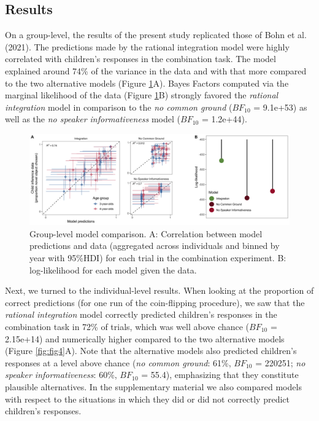 \documentclass[
  man,mask,floatsintext]{apa6}
\begin{document}
\hypertarget{results-1}{%
\subsection{Results}\label{results-1}}

On a group-level, the results of the present study replicated those of Bohn et al. (2021). The predictions made by the rational integration model were highly correlated with children's responses in the combination task. The model explained around 74\% of the variance in the data and with that more compared to the two alternative models (Figure \ref{fig:fig3}A). Bayes Factors computed via the marginal likelihood of the data (Figure \ref{fig:fig3}B) strongly favored the \emph{rational integration} model in comparison to the \emph{no common ground} (\(BF_{10}\) = 9.1e+53) as well as the \emph{no speaker informativeness} model (\(BF_{10}\) = 1.2e+44).

\begin{figure}
\includegraphics[width=1\linewidth]{./figures/fig3} \caption{Group-level model comparison. A: Correlation between model predictions and data (aggregated across individuals and binned by year with 95\%HDI) for each trial in the combination experiment. B: log-likelihood for each model given the data.}\label{fig:fig3}
\end{figure}

Next, we turned to the individual-level results. When looking at the proportion of correct predictions (for one run of the coin-flipping procedure), we saw that the \emph{rational integration} model correctly predicted children's responses in the combination task in 72\% of trials, which was well above chance (\(BF_{10}\) = 2.15e+14) and numerically higher compared to the two alternative models (Figure \ref{fig:fig4}A). Note that the alternative models also predicted children's responses at a level above chance (\emph{no common ground}: 61\%, \(BF_{10}\) = 220251; \emph{no speaker informativeness}: 60\%, \(BF_{10}\) = 55.4), emphasizing that they constitute plausible alternatives. In the supplementary material we also compared models with respect to the situations in which they did or did not correctly predict children's responses.
\end{document}
